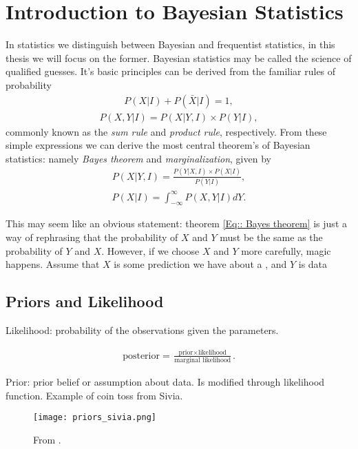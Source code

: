 \documentclass[twoside,english]{uiofysmaster}
\begin{document}
\section{Introduction to Bayesian Statistics}

In statistics we distinguish between Bayesian and frequentist statistics, in this thesis we will focus on the former. Bayesian statistics may be called the science of qualified guesses. It's basic principles can be derived from the familiar rules of probability
\begin{align}\label{Eq:: Sum rule}
P(X | I) + P(\bar{X} | I) = 1,
\end{align}
\begin{align}\label{Eq:: Product rule}
P(X, Y | I) = P(X | Y, I) \times P(Y | I),
\end{align} 
commonly known as the \textit{sum rule} and \textit{product rule}, respectively. From these simple expressions we can derive the most central theorem's of Bayesian statistics: namely \textit{Bayes theorem} and \textit{marginalization}, given by
\begin{align}\label{Eq:: Bayes theorem}
P(X | Y, I) = \frac{P(Y | X, I) \times P(X | I)}{P(Y | I)},
\end{align}
\begin{align}
P(X | I) = \int_{- \infty}^{\infty} P(X, Y | I) d Y.
\end{align}

This may seem like an obvious statement: theorem \ref{Eq:: Bayes theorem} is just a way of rephrasing that the probability of $X$ and $Y$ must be the same as the probability of $Y$ and $X$. However, if we choose $X$ and $Y$ more carefully, magic happens. Assume that $X$ is some prediction we have about a , and $Y$ is data 

\subsection{Priors and Likelihood}

Likelihood: probability of the observations given the parameters.

\begin{align}
\text{posterior} = \frac{\text{prior} \times \text{likelihood}}{\text{marginal likelihood}}.
\end{align}

Prior: prior belief or assumption about data. Is modified through likelihood function. Example of coin toss from Sivia.

\begin{figure}
\centering
\texttt{[image: priors\_sivia.png]}
\caption{From \cite{sivia2006data}.}
\end{figure}
\end{document}

